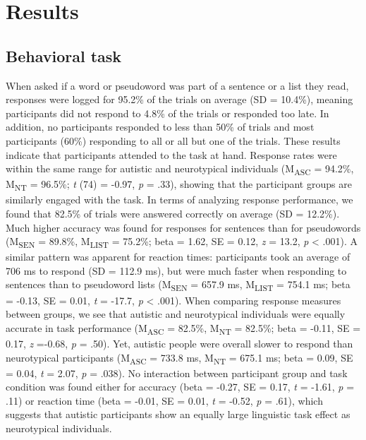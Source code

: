 \section{Results}
\subsection{Behavioral task}
When asked if a word or pseudoword was part of a sentence or a list they read, responses were logged for 95.2\% of the trials on average (SD = 10.4\%), meaning participants did not respond to 4.8\% of the trials or responded too late. In addition, no participants responded to less than 50\% of trials and most participants (60\%) responding to all or all but one of the trials. These results indicate that participants attended to the task at hand. Response rates were within the same range for autistic and neurotypical individuals (M\textsubscript{ASC} = 94.2\%,  M\textsubscript{NT} = 96.5\%; \textit{t} (74) = -0.97, \textit{p} = .33), showing that the participant groups are similarly engaged with the task. In terms of analyzing response performance, we found that 82.5\% of trials were answered correctly on average (SD = 12.2\%). Much higher accuracy was found for responses for sentences than for pseudowords (M\textsubscript{SEN} = 89.8\%,  M\textsubscript{LIST} = 75.2\%; beta = 1.62, SE = 0.12, \textit{z} = 13.2, \textit{p} <  .001). A similar pattern was apparent for reaction times: participants took an average of 706 ms to respond (SD = 112.9 ms), but were much faster when responding to sentences than to pseudoword lists (M\textsubscript{SEN} = 657.9 ms,  M\textsubscript{LIST} = 754.1 ms; beta =  -0.13, SE = 0.01, \textit{t} = -17.7, \textit{p} <  .001). When comparing response measures between groups, we see that autistic and neurotypical individuals were equally accurate in task performance  (M\textsubscript{ASC} = 82.5\%,  M\textsubscript{NT} = 82.5\%; beta = -0.11, SE = 0.17, \textit{z} =-0.68, \textit{p} = .50). Yet, autistic people were overall slower to respond than neurotypical participants (M\textsubscript{ASC} = 733.8 ms,  M\textsubscript{NT} = 675.1 ms; beta = 0.09, SE = 0.04, \textit{t} = 2.07, \textit{p} = .038). No interaction between participant group and task condition was found either for accuracy (beta = -0.27, SE = 0.17, \textit{t} = -1.61, \textit{p} = .11) or reaction time (beta = -0.01, SE = 0.01, \textit{t} = -0.52, \textit{p} = .61), which suggests that autistic participants show an equally large linguistic task effect as neurotypical individuals.


